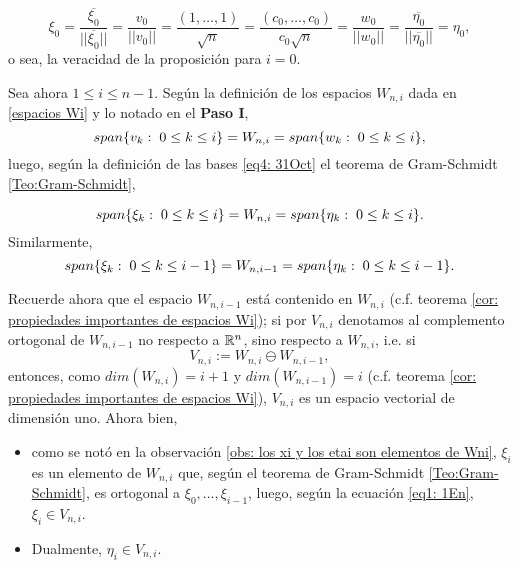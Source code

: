\begin{itemize}
\[
\xi_{0}=
\frac{\overline{\xi_{0}}}{||\overline{\xi_{0}}||}=
\frac{v_{0}}{||v_{0}||}=\frac{(1, \ldots , 1)}{\sqrt{n}}=
\frac{(c_{0}, \ldots , c_{0})}{c_{0}\sqrt{n}}= \frac{w_{0}}{||w_{0}||}=
\frac{\overline{\eta_{0}}}{||\overline{\eta_{0}}||}=\eta_{0},
\]
o sea, la veracidad de la proposición para $i=0$.



Sea ahora $1 \leq i \leq n-1$.
Según la definición de los espacios
$W_{n,i}$ dada en \eqref{espacios Wi}
y lo notado en el \textbf{Paso I},
\[
span\{ v_{k}: \hspace{0.1cm} 0 \leq k \leq i \}=W_{n,i}=
span\{ w_{k}: \hspace{0.1cm} 0 \leq k \leq i \},
\]
luego, según la definición de las bases
\eqref{eq4: 31Oct}
el teorema de Gram-Schmidt
\ref{Teo:Gram-Schmidt},

\[
span\{ \xi_{k}: \hspace{0.1cm} 0 \leq k \leq i \}=
W_{n,i} =span\{ \eta_{k}: \hspace{0.1cm} 0 \leq k \leq i \}.
\]
\noindent
Similarmente,
\[
span\{ \xi_{k}: \hspace{0.1cm} 0 \leq k \leq i-1 \}=
W_{n,i-1} =span\{ \eta_{k}: \hspace{0.1cm} 0 \leq k \leq i-1 \}.
\]

Recuerde ahora que el espacio $W_{n,i-1}$
está contenido en $W_{n,i}$
(c.f. teorema \ref{cor: propiedades importantes de espacios Wi});
si por $V_{n,i}$ denotamos al complemento ortogonal de $W_{n,i-1}$
no respecto a $\mathbb{R}^{n}$, sino 
respecto a $W_{n,i}$, i.e. si
\begin{equation}
\label{eq1: 1En}
V_{n,i} := W_{n,i} \ominus W_{n,i-1},
\end{equation}
entonces, como 
$dim(W_{n,i})=i+1$ y $dim(W_{n,i-1})=i$
(c.f. teorema \ref{cor: propiedades importantes de espacios Wi}), 
$V_{n,i}$ es un espacio
vectorial de dimensión uno. Ahora bien,

\begin{itemize}
\item como se notó en la observación 
\ref{obs: los xi y los etai son elementos de Wni},
$\xi_{i}$ es un elemento de $W_{n,i}$ que,
según el teorema de Gram-Schmidt \ref{Teo:Gram-Schmidt},
es ortogonal
a $\xi_{0}, \ldots , \xi_{i-1}$, luego, 
según la ecuación \eqref{eq1: 1En},
$\xi_{i} \in V_{n,i}$.

\item Dualmente, $\eta_{i} \in V_{n,i}$.
\end{itemize}


\end{itemize}
